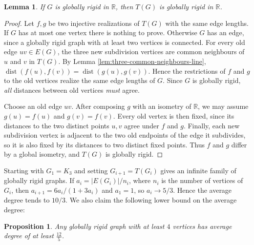 \documentclass[fullpage,11pt]{article}
\providecommand{\dist}{\operatorname{dist}}
\theoremstyle{break}
\newtheorem{lemma}[theorem]{Lemma}
\newtheorem{proposition}[theorem]{Proposition}
\theoremstyle{definition}
\theoremstyle{break}
\begin{document}
\begin{lemma}
    If $G$ is globally rigid in $\mathbb{R}$, then $T(G)$ is globally rigid in $\mathbb{R}$.
\end{lemma}

\begin{proof}
    Let \(f,g\) be two injective realizations of \(T(G)\) with the same edge
    lengths. If \(G\) has at most one vertex there is nothing to prove.
    Otherwise \(G\) has an edge, since a globally rigid graph with at least
    two vertices is connected. For every old edge \(uv\in E(G)\), the three
    new subdivision vertices are common neighbours of \(u\) and \(v\) in
    \(T(G)\). By Lemma \ref{lem:three-common-neighbours-line},
    \(\dist(f(u),f(v))=\dist(g(u),g(v))\). Hence the restrictions of \(f\)
    and \(g\) to the old vertices realize the same edge lengths of \(G\).
    Since \(G\) is globally rigid, \emph{all} distances between old vertices \emph{must} agree.

    Choose an old edge \(uv\). After composing \(g\) with an isometry of
    \(\mathbb R\), we may assume \(g(u)=f(u)\) and \(g(v)=f(v)\). Every old
    vertex is then fixed, since its distances to the two distinct points
    \(u,v\) agree under \(f\) and \(g\). Finally, each new subdivision vertex
    is adjacent to the two old endpoints of the edge it subdivides, so it is
    also fixed by its distances to two distinct fixed points. Thus \(f\) and
    \(g\) differ by a global isometry, and \(T(G)\) is globally rigid.
\end{proof}

Starting with $G_1=K_3$ and setting $G_{i+1}=T(G_i)$ gives an infinite family of globally rigid graphs. If $a_i=|E(G_i)|/n_i$, where $n_i$ is the number of vertices of $G_i$, then $a_{i+1}=6a_i/(1+3a_i)$ and $a_1=1$, so $a_i\to 5/3$. Hence the average degree tends to $10/3$.
We also claim the following lower bound on the average degree:

\begin{proposition}
    Any globally rigid graph with at least $4$ vertices has average degree of at least $\frac{12}{5}$.
\end{proposition}
\end{document}
